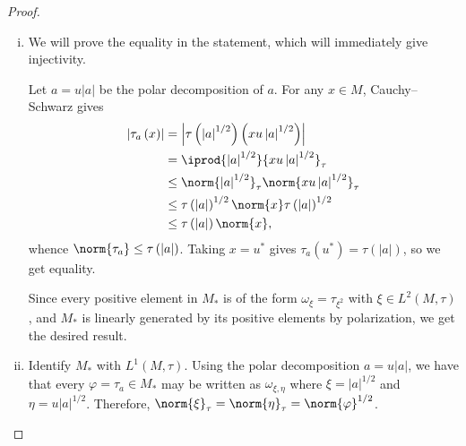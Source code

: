 \documentclass[10pt]{mypackage}
\begin{document}
\begin{proof}\hfill
  \begin{enumerate}[(i)]
    \item We will prove the equality in the statement, which will immediately give injectivity.

      Let $a = u\left\vert a \right\vert$ be the polar decomposition of $a$. For any $x\in M$, Cauchy--Schwarz gives
      \begin{align*}
        \left\vert \tau_a\left( x \right) \right\vert &= \left\vert \tau\left( \left\vert a \right\vert^{1/2} \right)\left( xu\left\vert a \right\vert^{1/2} \right) \right\vert\\
                                                      &= \iprod{\left\vert a \right\vert^{1/2}}{xu\left\vert a \right\vert^{1/2}}_{\tau}\\
                                                      &\leq \norm{\left\vert a \right\vert^{1/2}}_{\tau}\norm{xu\left\vert a \right\vert^{1/2}}_{\tau}\\
                                                      &\leq \tau\left( \left\vert a \right\vert \right)^{1/2}\norm{x}\tau\left( \left\vert a \right\vert \right)^{1/2}\\
                                                      &\leq \tau\left( \left\vert a \right\vert \right)\norm{x},
      \end{align*}
      whence $\norm{\tau_a} \leq \tau\left( \left\vert a \right\vert \right)$. Taking $x = u^{\ast}$ gives $\tau_a\left( u^{\ast} \right) = \tau\left( \left\vert a \right\vert \right)$, so we get equality.

      Since every positive element in $M_{\ast}$ is of the form $\omega_{\xi} = \tau_{\xi^2}$ with $\xi\in L^2\left( M,\tau \right)$, and $M_{\ast}$ is linearly generated by its positive elements by polarization, we get the desired result.
    \item Identify $M_{\ast}$ with $L^1\left( M,\tau \right)$. Using the polar decomposition $a = u\left\vert a \right\vert$, we have that every $\varphi = \tau_a\in M_{\ast}$ may be written as $\omega_{\xi,\eta}$ where $\xi = \left\vert a \right\vert^{1/2}$ and $\eta = u\left\vert a \right\vert^{1/2}$. Therefore, $\norm{\xi}_{\tau} = \norm{\eta}_{\tau} = \norm{\varphi}^{1/2}$.


\end{enumerate}
\end{proof}
\end{document}
